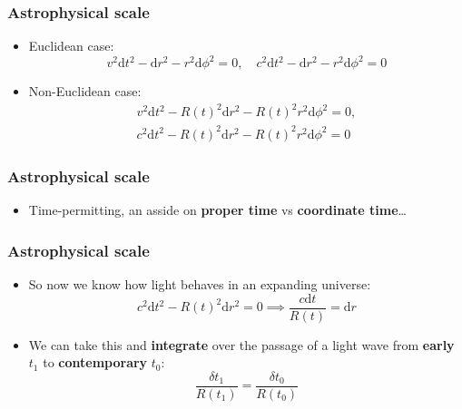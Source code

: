 \documentclass{beamer}
\begin{document}
\begin{frame}
  \frametitle{Astrophysical scale}
  \begin{itemize}
    \item Euclidean case:
      \begin{equation*}
	v^2\mathrm{d}t^2-\mathrm{d}r^2-r^2\mathrm{d}\phi^2=0,\quad c^2\mathrm{d}t^2-\mathrm{d}r^2-r^2\mathrm{d}\phi^2=0
      \end{equation*}
    \item Non-Euclidean case:
      \begin{gather*}
	v^2\mathrm{d}t^2-R(t)^2\mathrm{d}r^2-R(t)^2r^2\mathrm{d}\phi^2=0,\\
	c^2\mathrm{d}t^2-R(t)^2\mathrm{d}r^2-R(t)^2r^2\mathrm{d}\phi^2=0
      \end{gather*}
  \end{itemize}
\end{frame}

\begin{frame}
  \frametitle{Astrophysical scale}
  \begin{itemize}
    \item Time-permitting, an asside on \textbf{proper time} vs \textbf{coordinate time}\ldots
  \end{itemize}
\end{frame}

\begin{frame}
  \frametitle{Astrophysical scale}
  \begin{itemize}
    \item So now we know how light behaves in an expanding universe:
      \begin{equation*}
	c^2\mathrm{d}t^2-R(t)^2\mathrm{d}r^2=0 \implies \frac{c\mathrm{d}t}{R(t)}=\mathrm{d}r	
      \end{equation*}
    \item We can take this and \textbf{integrate} over the passage of a light wave from \textbf{early} $t_1$ to \textbf{contemporary} $t_0$:
      \begin{equation*}
	\frac{\delta t_1}{R(t_1)}=\frac{\delta t_0}{R(t_0)}
      \end{equation*}
  \end{itemize}
\end{frame}
\end{document}

